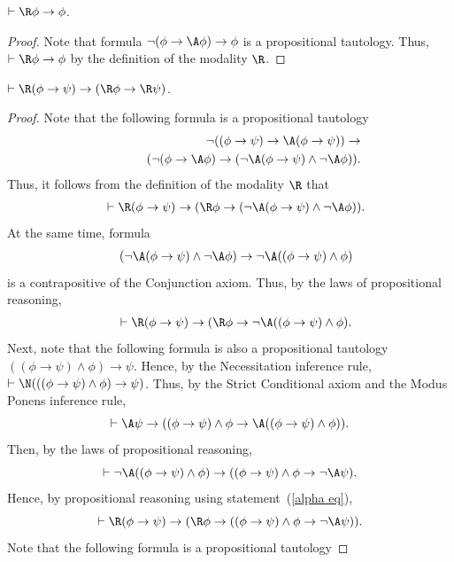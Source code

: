 \documentclass[letterpaper]{article}
\begin{document}
\begin{lemma}\label{truth axiom for R}
$\vdash\R\phi\to\phi$.
\end{lemma}
\begin{proof}
Note that formula $\neg(\phi\to\A\phi)\to\phi$ is a propositional tautology. Thus, $\vdash \R\phi\to\phi$ by the definition of the modality $\R$.
\end{proof}

\begin{lemma}\label{K axiom for R}
$\vdash\R(\phi\to\psi)\to(\R\phi\to\R\psi)$.
\end{lemma}
\begin{proof}
Note that the following formula is a propositional tautology
\begin{eqnarray*}
&&\neg((\phi\to\psi)\to\A(\phi\to\psi))\to\\
&&\hspace{10mm}(\neg(\phi\to\A\phi) \to (\neg\A(\phi\to\psi) \wedge \neg\A\phi)).
\end{eqnarray*}
Thus, it follows from the definition of the modality $\R$ that
\begin{eqnarray*}
&&\vdash \R(\phi\to\psi)\to(\R\phi \to (\neg\A(\phi\to\psi) \wedge \neg\A\phi)).
\end{eqnarray*}
At the same time, formula
\begin{eqnarray*}
&&(\neg\A(\phi\to\psi) \wedge \neg\A\phi)\to \neg\A((\phi\to\psi)\wedge\phi)
\end{eqnarray*}
is a contrapositive of the Conjunction axiom. Thus, by the laws of propositional reasoning,
\begin{eqnarray}\label{alpha eq}
&&\vdash \R(\phi\to\psi)\to(\R\phi \to \neg\A((\phi\to\psi)\wedge\phi).
\end{eqnarray}
Next, note that the following formula is also a propositional tautology
$
((\phi\to\psi)\wedge\phi)\to\psi
$.
Hence, by the Necessitation inference rule,
$
\vdash\N(((\phi\to\psi)\wedge\phi)\to\psi)
$.
Thus, by the Strict Conditional axiom and the Modus Ponens inference rule,
$$
\vdash\A\psi\to  ((\phi\to\psi)\wedge\phi\to\A((\phi\to\psi)\wedge \phi)).
$$
Then, by the laws of propositional reasoning,
$$
\vdash\neg\A((\phi\to\psi)\wedge \phi)\to ((\phi\to\psi)\wedge \phi\to\neg\A\psi).
$$
Hence, by propositional reasoning using statement~(\ref{alpha eq}),
\begin{equation}\label{beta equation}
\vdash \R(\phi\to\psi)\to(\R\phi \to ((\phi\to\psi)\wedge \phi\to\neg\A\psi)).
\end{equation}
Note that the following formula is a propositional tautology

\end{proof}
\end{document}
